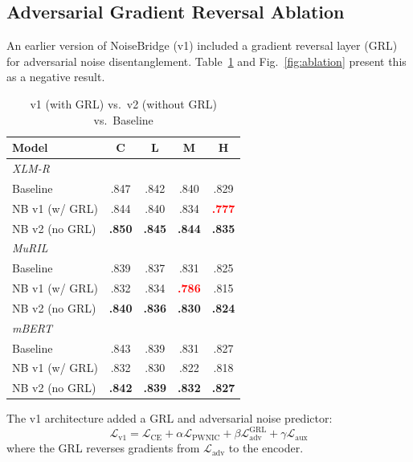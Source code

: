 \documentclass[conference]{IEEEtran}
\begin{document}
\subsection{Adversarial Gradient Reversal Ablation}
\label{sec:ablation}

An earlier version of NoiseBridge (v1) included a gradient reversal layer (GRL)~\cite{ganin2016domain} for adversarial noise disentanglement. Table~\ref{tab:ablation} and Fig.~\ref{fig:ablation} present this as a negative result.

\begin{table}[H]
\caption{v1 (with GRL) vs.\ v2 (without GRL) vs.\ Baseline}
\label{tab:ablation}
\centering
\small
\begin{tabular}{l@{\hskip 6pt}cccc}
\toprule
\textbf{Model} & \textbf{C} & \textbf{L} & \textbf{M} & \textbf{H} \\
\midrule
\multicolumn{5}{l}{\textit{XLM-R}} \\
Baseline       & .847 & .842 & .840 & .829 \\
NB v1 (w/ GRL) & .844 & .840 & .834 & \textcolor{red}{\textbf{.777}} \\
NB v2 (no GRL) & \textbf{.850} & \textbf{.845} & \textbf{.844} & \textbf{.835} \\
\midrule
\multicolumn{5}{l}{\textit{MuRIL}} \\
Baseline       & .839 & .837 & .831 & .825 \\
NB v1 (w/ GRL) & .832 & .834 & \textcolor{red}{\textbf{.786}} & .815 \\
NB v2 (no GRL) & \textbf{.840} & \textbf{.836} & \textbf{.830} & \textbf{.824} \\
\midrule
\multicolumn{5}{l}{\textit{mBERT}} \\
Baseline       & .843 & .839 & .831 & .827 \\
NB v1 (w/ GRL) & .832 & .830 & .822 & .818 \\
NB v2 (no GRL) & \textbf{.842} & \textbf{.839} & \textbf{.832} & \textbf{.827} \\
\bottomrule
\end{tabular}
\end{table}


The v1 architecture added a GRL and adversarial noise predictor:
\begin{equation}
\mathcal{L}_{\text{v1}} = \mathcal{L}_\text{CE} + \alpha \mathcal{L}_{\text{PWNIC}} + \beta \mathcal{L}_\text{adv}^{\text{GRL}} + \gamma \mathcal{L}_\text{aux}
\end{equation}
where the GRL reverses gradients from $\mathcal{L}_\text{adv}$ to the encoder.
\end{document}
